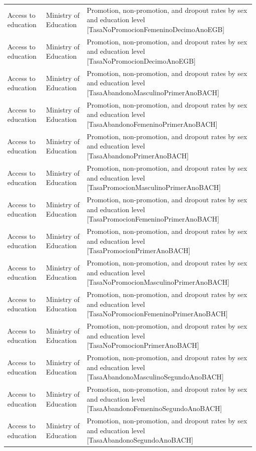 \documentclass[10pt,a4paper]{article}
\begin{document}
\begin{longtable}{@{}>{\raggedright\arraybackslash}p{3.5cm}>{\raggedright\arraybackslash}p{5.6cm}>{\raggedright\arraybackslash}p{\dimexpr\textwidth-9.1cm-4\tabcolsep\relax}@{}}
Access to education & Ministry of Education & Promotion, non-promotion, and dropout rates by sex and education level [TasaNoPromocionFemeninoDecimoAnoEGB]\\
Access to education & Ministry of Education & Promotion, non-promotion, and dropout rates by sex and education level [TasaNoPromocionDecimoAnoEGB]\\
Access to education & Ministry of Education & Promotion, non-promotion, and dropout rates by sex and education level [TasaAbandonoMasculinoPrimerAnoBACH]\\
Access to education & Ministry of Education & Promotion, non-promotion, and dropout rates by sex and education level [TasaAbandonoFemeninoPrimerAnoBACH]\\
Access to education & Ministry of Education & Promotion, non-promotion, and dropout rates by sex and education level [TasaAbandonoPrimerAnoBACH]\\
Access to education & Ministry of Education & Promotion, non-promotion, and dropout rates by sex and education level [TasaPromocionMasculinoPrimerAnoBACH]\\
Access to education & Ministry of Education & Promotion, non-promotion, and dropout rates by sex and education level [TasaPromocionFemeninoPrimerAnoBACH]\\
Access to education & Ministry of Education & Promotion, non-promotion, and dropout rates by sex and education level [TasaPromocionPrimerAnoBACH]\\
Access to education & Ministry of Education & Promotion, non-promotion, and dropout rates by sex and education level [TasaNoPromocionMasculinoPrimerAnoBACH]\\
Access to education & Ministry of Education & Promotion, non-promotion, and dropout rates by sex and education level [TasaNoPromocionFemeninoPrimerAnoBACH]\\
Access to education & Ministry of Education & Promotion, non-promotion, and dropout rates by sex and education level [TasaNoPromocionPrimerAnoBACH]\\
Access to education & Ministry of Education & Promotion, non-promotion, and dropout rates by sex and education level [TasaAbandonoMasculinoSegundoAnoBACH]\\
Access to education & Ministry of Education & Promotion, non-promotion, and dropout rates by sex and education level [TasaAbandonoFemeninoSegundoAnoBACH]\\
Access to education & Ministry of Education & Promotion, non-promotion, and dropout rates by sex and education level [TasaAbandonoSegundoAnoBACH]\\

\end{longtable}
\end{document}
